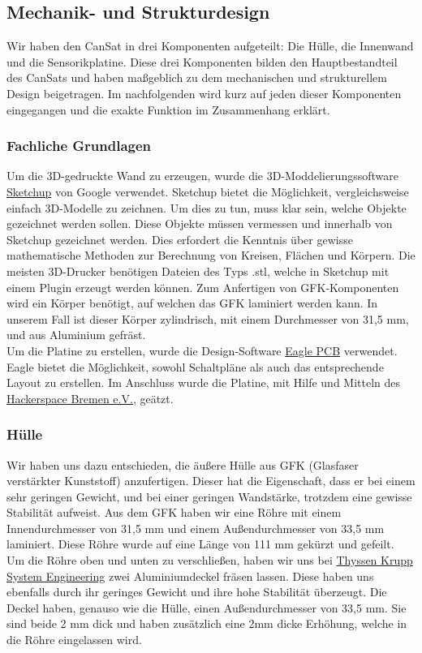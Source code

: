 \subsection{Mechanik- und Strukturdesign}

Wir haben den CanSat in drei Komponenten aufgeteilt: Die Hülle, die Innenwand und die Sensorikplatine. Diese drei Komponenten bilden den Hauptbestandteil des CanSats und haben maßgeblich zu dem mechanischen und strukturellem Design beigetragen. Im nachfolgenden wird kurz auf jeden dieser Komponenten eingegangen und die exakte Funktion im Zusammenhang erklärt.

\subsubsection{Fachliche Grundlagen}
Um die 3D-gedruckte Wand zu erzeugen, wurde die 3D-Moddelierungssoftware \href{http://www.sketchup.com/de} {Sketchup} von Google verwendet. Sketchup bietet die Möglichkeit, vergleichsweise einfach 3D-Modelle zu zeichnen. Um dies zu tun, muss klar sein, welche Objekte gezeichnet werden sollen. Diese Objekte müssen vermessen und innerhalb von Sketchup gezeichnet werden. Dies erfordert die Kenntnis über gewisse mathematische Methoden zur Berechnung von Kreisen, Flächen und Körpern. Die meisten 3D-Drucker benötigen Dateien des Typs .stl, welche in Sketchup mit einem Plugin erzeugt werden können.
Zum Anfertigen von GFK-Komponenten wird ein Körper benötigt, auf welchen das GFK laminiert werden kann. In unserem Fall ist dieser Körper zylindrisch, mit einem Durchmesser von 31,5 mm, und aus Aluminium gefräst. \\
Um die Platine zu erstellen, wurde die Design-Software \href{http://www.cadsoft.de/eagle-pcb-design-software/} {Eagle PCB} verwendet. Eagle bietet die Möglichkeit, sowohl Schaltpläne als auch das entsprechende Layout zu erstellen. Im Anschluss wurde die Platine, mit Hilfe und Mitteln des \href{https://www.hackerspace-bremen.de/}{Hackerspace Bremen e.V.}, geätzt.

\subsubsection{Hülle}
Wir haben uns dazu entschieden, die äußere Hülle aus GFK (Glasfaser verstärkter Kunststoff) anzufertigen. Dieser hat die Eigenschaft, dass er bei einem sehr geringen Gewicht, und bei einer geringen Wandstärke, trotzdem eine gewisse Stabilität aufweist. Aus dem GFK haben wir eine Röhre mit einem Innendurchmesser von 31,5 mm und einem Außendurchmesser von 33,5 mm laminiert. Diese Röhre wurde auf eine Länge von 111 mm gekürzt und gefeilt. Um die Röhre oben und unten zu verschließen, haben wir uns bei \href{http://www.thyssenkrupp-system-engineering.com/de/home.html}{Thyssen Krupp System Engineering} zwei Aluminiumdeckel fräsen lassen. Diese haben uns ebenfalls durch ihr geringes Gewicht und ihre hohe Stabilität überzeugt. Die Deckel haben, genauso wie die Hülle, einen Außendurchmesser von 33,5 mm. Sie sind beide 2 mm dick und haben zusätzlich eine 2mm dicke Erhöhung, welche in die Röhre eingelassen wird.

